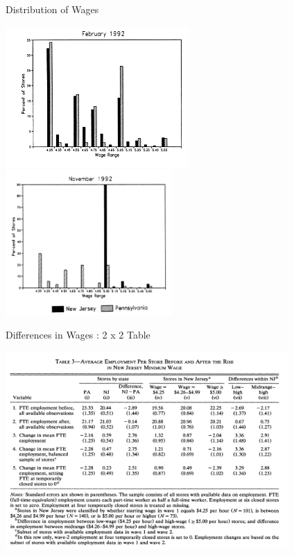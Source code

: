 \documentclass[xcolor=pdftex,dvipsnames,table,mathserif,aspectratio=169]{beamer}
\begin{document}
\begin{frame}{Distribution of Wages}
\begin{center}
\includegraphics[width=2.75in]{./resources/ck_fig1b.png}
\includegraphics[width=2.5in]{./resources/ck_fig1a.png}
\end{center}
\end{frame}


\begin{frame}{Differences in Wages : 2 x 2 Table}
\begin{center}
\includegraphics[width=4.25in]{./resources/ck_tab3.png}
\end{center}
\end{frame}
\end{document}
